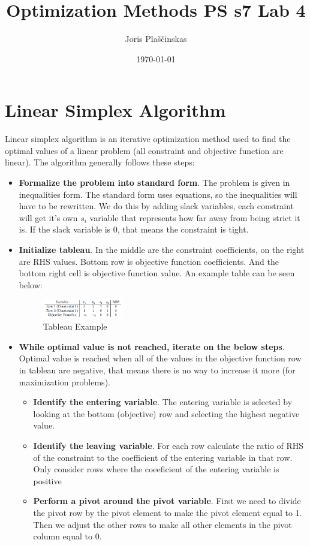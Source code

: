 \documentclass{article}
\title{Optimization Methods PS s7 Lab 4}
\author{Joris Plaščinskas}
\date{\today}
\begin{document}
\maketitle
\section*{Linear Simplex Algorithm}
Linear simplex algorithm is an iterative optimization method used to find the optimal values of a linear problem (all constraint and objective function are linear). The algorithm generally follows these steps:
\begin{itemize}
    \item \textbf{Formalize the problem into standard form}. The problem is given in inequalities form. The standard form uses equations, so the inequalities will have to be rewritten. We do this by adding slack variables, each constraint will get it's own $s_i$ variable that represents how far away from being strict it is. If the slack variable is 0, that means the constraint is tight.
    \item \textbf{Initialize tableau}. In the middle are the constraint coefficients, on the right are RHS values. Bottom row is objective function coefficients. And the bottom right cell is objective function value. An example table can be seen below:
    \begin{figure}[H]
        \centering
        \includegraphics[width=0.333\textwidth]{tableau-example.png}
        \caption{Tableau Example}
        \label{fig:tableau-example}
    \end{figure}
    \item \textbf{While optimal value is not reached, iterate on the below steps}. Optimal value is reached when all of the values in the objective function row in tableau are negative, that means there is no way to increase it more (for maximization problems).
    \begin{itemize}
        \item \textbf{Identify the entering variable}. The entering variable is selected by looking at the bottom (objective) row and selecting the highest negative value.
        \item \textbf{Identify the leaving variable}. For each row calculate the ratio of RHS of the constraint to the coefficient of the entering variable in that row. Only consider rows where the coeeficient of the entering variable is positive
        \item \textbf{Perform a pivot around the pivot variable}. First we need to divide the pivot row by the pivot element to make the pivot element equal to 1. Then we adjust the other rows to make all other elements in the pivot column equal to 0.
    \end{itemize}
\end{itemize}
\end{document}
